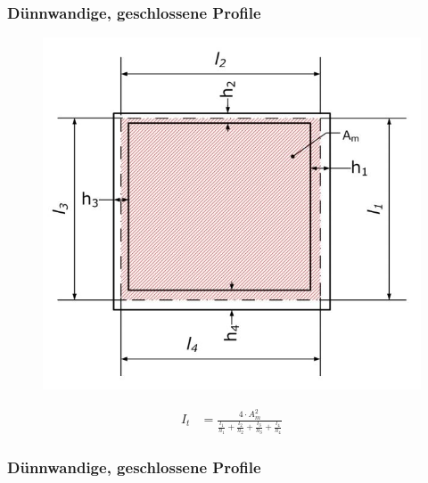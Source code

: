 \newpage

\subsubsection*{Dünnwandige, geschlossene Profile}


\begin{figure}[h]
	\centering
	\includegraphics[scale=0.6]{Torsion_2.jpg}
\end{figure}


\begin{align*}
I_t &= \frac{4 \cdot A_m^2}{\frac{l_1}{h_1} + \frac{l_2}{h_2} + \frac{l_3}{h_3} + \frac{l_4}{h_4}}
\end{align*}


\subsubsection*{Dünnwandige, geschlossene Profile}


